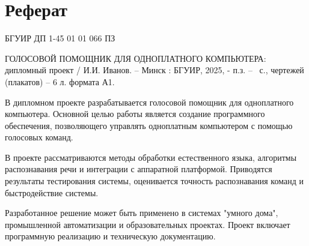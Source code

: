 \section*{Реферат}
\thispagestyle{empty} %

\noindent БГУИР ДП 1-45 01 01 066 ПЗ
\newline

\nohyphens{ГОЛОСОВОЙ ПОМОЩНИК ДЛЯ ОДНОПЛАТНОГО КОМПЬЮТЕРА}: дипломный проект / И.И. Иванов. – Минск : БГУИР, 2025, - п.з. – \pageref{LastPage}~с., чертежей (плакатов) – 6 л. формата А1.

В дипломном проекте разрабатывается голосовой помощник для одноплатного компьютера. Основной целью работы является создание программного обеспечения, позволяющего управлять одноплатным компьютером с помощью голосовых команд. 

В проекте рассматриваются методы обработки естественного языка, алгоритмы распознавания речи и интеграции с аппаратной платформой. Приводятся результаты тестирования системы, оценивается точность распознавания команд и быстродействие системы. 

Разработанное решение может быть применено в системах "умного дома", промышленной \cite{rte-about} автоматизации и образовательных проектах. Проект включает программную реализацию и техническую документацию.

\clearpage
